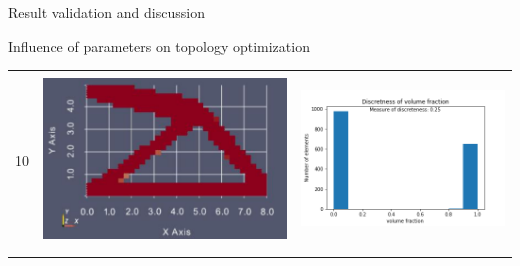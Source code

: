 \documentclass[a4paper,12pt,times]{article}
\begin{document}
\begin{section}{Result validation and discussion}
\begin{subsection}{Influence of parameters on topology optimization}
\begin{center}
\begin{table} [H]
\begin{tabular}{c|c|c}
\\\hline\\ 
10&\includegraphics[scale = 0.5]{penal_10.png} & \includegraphics[scale = 0.4]{MMA_discretness_penal_10.png}\\ 
\\\hline\\ 

\end{tabular}
\end{table}
\end{center}
\end{subsection}
\end{section}
\end{document}
